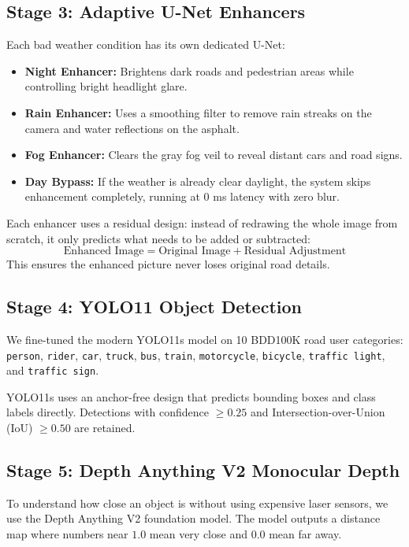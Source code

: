 \documentclass{article}
\begin{document}
\subsection{Stage 3: Adaptive U-Net Enhancers}
Each bad weather condition has its own dedicated U-Net:
\begin{itemize}
    \item \textbf{Night Enhancer:} Brightens dark roads and pedestrian areas while controlling bright headlight glare.
    \item \textbf{Rain Enhancer:} Uses a smoothing filter to remove rain streaks on the camera and water reflections on the asphalt.
    \item \textbf{Fog Enhancer:} Clears the gray fog veil to reveal distant cars and road signs.
    \item \textbf{Day Bypass:} If the weather is already clear daylight, the system skips enhancement completely, running at 0 ms latency with zero blur.
\end{itemize}
Each enhancer uses a residual design: instead of redrawing the whole image from scratch, it only predicts what needs to be added or subtracted:
\begin{equation}
\text{Enhanced Image} = \text{Original Image} + \text{Residual Adjustment}
\end{equation}
This ensures the enhanced picture never loses original road details.

\subsection{Stage 4: YOLO11 Object Detection}
We fine-tuned the modern YOLO11s model on 10 BDD100K road user categories: \texttt{person}, \texttt{rider}, \texttt{car}, \texttt{truck}, \texttt{bus}, \texttt{train}, \texttt{motorcycle}, \texttt{bicycle}, \texttt{traffic light}, and \texttt{traffic sign}. 

YOLO11s uses an anchor-free design that predicts bounding boxes and class labels directly. Detections with confidence $\ge 0.25$ and Intersection-over-Union (IoU) $\ge 0.50$ are retained.

\subsection{Stage 5: Depth Anything V2 Monocular Depth}
To understand how close an object is without using expensive laser sensors, we use the Depth Anything V2 foundation model. The model outputs a distance map where numbers near $1.0$ mean very close and $0.0$ mean far away. 
\end{document}
